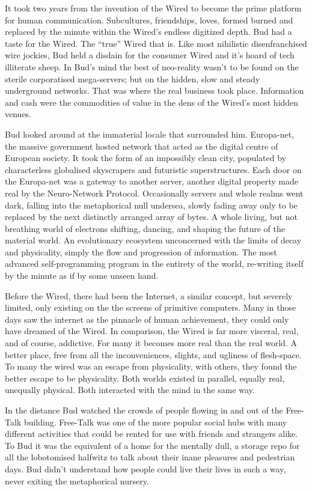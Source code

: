 \documentclass{book}
\begin{document}
It took two years from the invention of the Wired to become the prime platform for human communication. Subcultures, friendships, loves, formed burned and replaced by the minute within the Wired's endless digitized depth. Bud had a taste for the Wired. The ``true'' Wired that is. Like most nihilistic disenfranchised wire jockies, Bud held a disdain for the consumer Wired and it's hoard of tech illiterate sheep. In Bud's mind the best of neo-reality wasn't to be found on the sterile corporatised mega-servers; but on the hidden, slow and steady underground networks. That was where the real business took place. Information and cash were the commodities of value in the dens of the Wired's most hidden venues.

Bud looked around at the immaterial locale that surrounded him. Europa-net, the massive government hosted network that acted as the digital centre of European society. It took the form of an impossibly clean city, populated by characterless globalised skyscrapers and futuristic superstructures. Each door on the Europa-net was a gateway to another server, another digital property made real by the Neuro-Network Protocol. Occasionally servers and whole realms went dark, falling into the metaphorical null undersea, slowly fading away only to be replaced by the next distinctly arranged array of bytes. A whole living, but not breathing world of electrons shifting, dancing, and shaping the future of the material world. An evolutionary ecosystem unconcerned with the limits of decay and physicality, simply the flow and progression of information. The most advanced self-programming program in the entirety of the world, re-writing itself by the minute as if by some unseen hand.

Before the Wired, there had been the Internet, a similar concept, but severely limited, only existing on the the screens of primitive computers. Many in those days saw the internet as the pinnacle of human achievement, they could only have dreamed of the Wired. In comparison, the Wired is far more visceral, real, and of course, addictive. For many it becomes more real than the real world. A better place, free from all the inconveniences, slights, and ugliness of flesh-space. To many the wired was an escape from physicality, with others, they found the better escape to be physicality. Both worlds existed in parallel, equally real, unequally physical. Both interacted with the mind in the same way.

In the distance Bud watched the crowds of people flowing in and out of the Free-Talk building. Free-Talk was one of the more popular social hubs with many different activities that could be rented for use with friends and strangers alike. To Bud it was the equivalent of a home for the mentally dull, a storage repo for all the lobotomised halfwitz to talk about their inane pleasures and pedestrian days. Bud didn't understand how people could live their lives in such a way, never exiting the metaphorical nursery.
\end{document}
